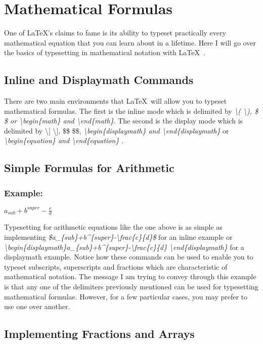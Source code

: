 \documentclass[12pt,journal,compsoc]{IEEEtran}
\begin{document}
\section{Mathematical Formulas}
One of \LaTeX\/'s claims to fame is its ability to typeset practically every mathematical equation that you can learn about in a lifetime. Here I will go over the basics of typesetting in mathematical notation with \LaTeX\ .
\subsection{Inline and Displaymath Commands}
 There are two main environments that \LaTeX\ will allow you to typeset mathematical formulas. The first is the inline mode which is delimited by \emph{\textbackslash ( \textbackslash), \$ \$ \emph{or} \textbackslash begin\{math\} \emph{and} \textbackslash end\{math\}}. The second is the display mode which is delimited by \textbackslash[ \textbackslash], \$\$ \$\$, \emph{\textbackslash begin\{displaymath\} \emph{and} \textbackslash end\{displaymath\}} or \emph{\textbackslash begin\{equation\} \emph{and} \textbackslash end\{equation\}} \cite{OL:math}.
\subsection{Simple Formulas for Arithmetic}
\subsubsection*{Example:}
\begin{center}
    $a_{sub}+b^{super}-\frac{c}{d}$
\end{center}
Typesetting for arithmetic equations like the one above is as simple as implementing \emph{\$a\_\{sub\}+b\^{}\{super\}-\textbackslash frac\{c\}\{d\}\$} for an inline example or \emph{\textbackslash begin\{displaymath\}a\_\{sub\}+b\^{}\{super\}-\textbackslash frac\{c\}\{d\}} \emph{\textbackslash end\{displaymath\}} for a displaymath example. Notice how these commands can be used to enable you to typeset subscripts, superscripts and fractions which are characteristic of mathematical notation. The message I am trying to convey through this example is that any one of the delimiters previously mentioned can be used for typesetting mathematical formulae. However, for a few particular cases, you may prefer to use one over another.
\subsection{Implementing Fractions and Arrays}
\end{document}
